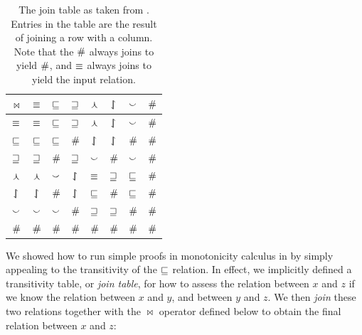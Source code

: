 %
%


\begin{table}[t]
	\begin{center}
	\begin{tabular}{|c||c|c|c|c|c|c|c|}
    \hline
    $\bowtie$ & $\equiv$ & $\sqsubseteq$ & $\sqsupseteq$ & $\curlywedge$ & $\downharpoonleft\hspace{-1.25mm}\upharpoonright$ & $\smallsmile$ & $\#$ \\
    \hline
    $\equiv$ & $\equiv$ & $\sqsubseteq$ & $\sqsupseteq$ & $\curlywedge$ & $\downharpoonleft\hspace{-1.25mm}\upharpoonright$ & $\smallsmile$ & $\#$ \\
    $\sqsubseteq$ & $\sqsubseteq$ & $\sqsubseteq$ & $\#$ & $\downharpoonleft\hspace{-1.25mm}\upharpoonright$ & $\downharpoonleft\hspace{-1.25mm}\upharpoonright$ & $\#$ & $\#$ \\
    $\sqsupseteq$ & $\sqsupseteq$ & $\#$ & $\sqsupseteq$ & $\smallsmile$ & $\#$ & $\smallsmile$ & $\#$  \\
    $\curlywedge$ & $\curlywedge$ & $\smallsmile$ & $\downharpoonleft\hspace{-1.25mm}\upharpoonright$ & $\equiv$ & $\sqsupseteq$ & $\sqsubseteq$ & $\#$  \\
    $\downharpoonleft\hspace{-1.25mm}\upharpoonright$ & $\downharpoonleft\hspace{-1.25mm}\upharpoonright$ & $\#$ & $\downharpoonleft\hspace{-1.25mm}\upharpoonright$ & $\sqsubseteq$ & $\#$ & $\sqsubseteq$ & $\#$  \\
    $\smallsmile$ & $\smallsmile$ & $\smallsmile$ & $\#$ & $\sqsupseteq$ & $\sqsupseteq$ & $\#$ & $\#$  \\
    $\#$ & $\#$ & $\#$ & $\#$ & $\#$ & $\#$ & $\#$ & $\#$ \\
    \hline
	\end{tabular}
	\caption{
    The join table as taken from .
    Entries in the table are the result of joining a row with a
      column.
    Note that the $\#$ always joins to yield $\#$,
    and $\equiv$ always joins to yield the input relation.
		\label{tab:natlog-jointable}
	}
	\end{center}
\end{table}



We showed how to run simple proofs in monotonicity calculus in 
   by simply appealing to the transitivity of the
  $\sqsubseteq$ relation.
In effect, we implicitly defined a transitivity table, or \textit{join table},
  for how to assess the relation between $x$ and $z$ if we know the relation
  between $x$ and $y$, and between $y$ and $z$.
We then \textit{join} these two relations together with the $\bowtie$ operator defined
  below to obtain the final relation between $x$ and $z$:
	
